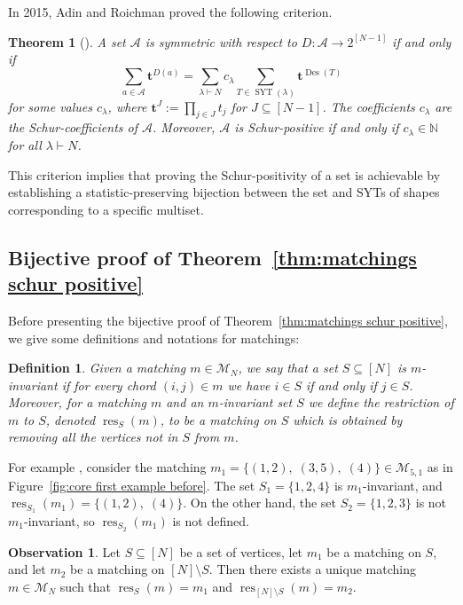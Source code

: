 \documentclass[11pt]{article}
\newtheorem{definition}[theo]{Definition}
\newtheorem{theorem}[theo]{Theorem}
\theoremstyle{definition}
\numberwithin{equation}{section}
\newcommand{\Des}{\operatorname{Des}}
\newcommand{\Syt}{\operatorname{SYT}}
\newcommand{\res}{\operatorname{res}}
\newcommand{\NN}{\mathbb{N}}
\newcommand{\A}{\mathcal{A}}
\newcommand{\M}{\mathcal{M}}
\newtheorem{observation}[theo]{Observation}
\begin{document}
In 2015, Adin and Roichman proved the following criterion.
\begin{theorem}[{\cite[Prop.\ 9.1]{adin_roichman_fine_set}}]
\label{thm:criterion schur positive young}
    A set $\A$ is symmetric with respect to $D:\A\to 2^{[N-1]}$ if and only if
    \[
        \sum_{a \in \A} \boldsymbol{t}^{D(a)} = \sum_{\lambda \vdash N} c_\lambda \sum_{T \in \Syt(\lambda)} \boldsymbol{t}^{\Des(T)}
    \]
    for some values $c_\lambda$, where $\boldsymbol{t}^J := \prod_{j \in J} t_j$ for $J \subseteq [N-1]$. The coefficients $c_\lambda$ are the Schur-coefficients of $\A$. Moreover, $\A$ is Schur-positive if and only if $c_{\lambda} \in \NN$ for all $\lambda \vdash N$.
\end{theorem}

This criterion implies that proving the Schur-positivity of a set is achievable by establishing a statistic-preserving bijection between the set and SYTs of shapes corresponding to a specific multiset.

\subsection{Bijective proof of Theorem~\ref{thm:matchings schur positive}}
\label{subsec:bijective proof matchings schur positive}

Before presenting the bijective proof of Theorem~\ref{thm:matchings schur positive}, we give some definitions and notations for matchings:






\begin{definition}
\label{def:restriction of matching}
    Given a matching $m \in \M_N$, we say that a set $S \subseteq [N]$ is $m$-invariant if for every chord $(i,j) \in m$ we have $i \in S$ if and only if $j \in S$. Moreover, for a matching $m$ and an $m$-invariant set $S$ we define the \emph{restriction} of $m$ to $S$, denoted $\res_S(m)$, to be a matching on $S$ which is obtained by removing all the vertices not in $S$ from $m$.
\end{definition}

For example , consider the matching $m_1 = \{(1,2),\; (3,5),\; (4)\} \in \M_{5,1}$ as in Figure~\ref{fig:core first example before}. The set $S_1=\{1,2,4\}$ is $m_1$-invariant, and $\res_{S_1}(m_1)=\{(1,2),\; (4)\}$. On the other hand, the set $S_2 = \{1,2,3\}$ is not $m_1$-invariant, so $\res_{S_2}(m_1)$ is not defined.


\begin{observation}
\label{obs:restriction of matching to set and complement defines uniquely}
    Let $S \subseteq [N]$ be a set of vertices, let $m_1$ be a matching on $S$, and let $m_2$ be a matching on $[N]\setminus S$. Then there exists a unique matching $m \in \M_N$ such that $\res_S(m) = m_1$ and $\res_{[N] \setminus S}(m) = m_2$.
\end{observation}
\end{document}
